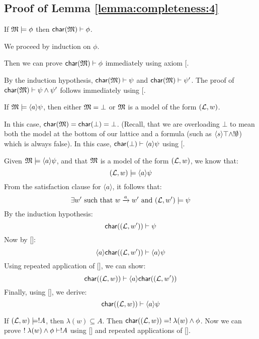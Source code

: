 \subsection{Proof of Lemma \ref{lemma:completeness:4}}
\label{prooflemma4}
If $\frak{M}\models \phi$ then $\mathsf{char}(\frak{M}) \vdash \phi$.

\NI We proceed by induction on $\phi$.


 Then we can prove $ \mathsf{char}(\frak{M}) \vdash \phi$
immediately using axiom [.

 By the induction hypothesis, $
\mathsf{char}(\frak{M}) \vdash \psi$ and $ \mathsf{char}(\frak{M}) \vdash \psi'$.  The proof
of $ \mathsf{char}(\frak{M}) \vdash \psi \land \psi'$ follows immediately using
[.

If $\frak{M} \models \langle a \rangle \psi$, then either $\MMM = \bot$ or $\frak{M}$ is a  model of the form $(\mathcal{L},w)$.

\SUBCASE{$\MMM = \bot$} In this case, $ \mathsf{char}(\frak{M}) = \mathsf{char}(\bot) =
\bot$. (Recall, that we are overloading $\bot$ to mean both the model
at the bottom of our lattice and a formula (such as $\langle s \rangle
\top \land !\emptyset$) which is always false).  In this case, $ \mathsf{char}(\bot)
\vdash \langle a \rangle \psi$ using [.

 Given $\frak{M} \models
\langle a \rangle \psi$, and that $\frak{M}$ is a model of the form
$(\mathcal{L},w)$, we know that:
\[
(\mathcal{L},w) \models \langle a \rangle \psi
\]
From the satisfaction clause for $\langle a \rangle$, it follows that:
\[
\exists w' \mbox{ such that } w \xrightarrow{a} w' \mbox { and } (\mathcal{L},w') \models \psi
\]
By the induction hypothesis:
\[
 \mathsf{char}((\mathcal{L},w')) \vdash \psi
\]
Now by []:
\[
\langle a \rangle  \mathsf{char}((\mathcal{L},w')) \vdash \langle a \rangle \psi
\]
Using repeated application of [], we can show:
\[
 \mathsf{char}((\mathcal{L},w)) \vdash \langle a \rangle  \mathsf{char}((\mathcal{L},w'))
\]
Finally, using [], we derive:
\[
 \mathsf{char}((\mathcal{L},w)) \vdash  \langle a \rangle \psi
\]

 If $(\mathcal{L},w) \models ! A$,
then $\lambda(w) \subseteq A$.  Then $ \mathsf{char}((\mathcal{L},w)) = ! \;
\lambda(w) \land \phi$.  Now we can prove $! \; \lambda(w) \land \phi
\vdash ! A$ using [] and repeated applications of
       [].

